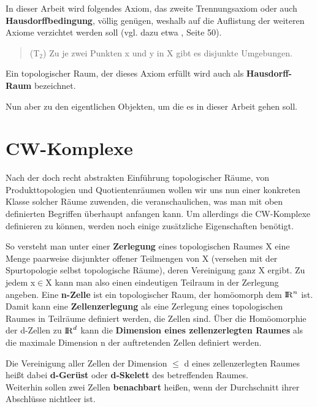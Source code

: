 In dieser Arbeit wird folgendes Axiom, das zweite Trennungsaxiom oder
auch {\bf Hausdorffbedingung}, völlig genügen, weshalb auf die Auflistung
der weiteren Axiome verzichtet werden soll (vgl. dazu etwa \cite{Os:92},
Seite 50).
\begin{quote}
(T$_2$) Zu je zwei Punkten x und y in X gibt es disjunkte Umgebungen.
\end{quote}
Ein topologischer Raum, der dieses Axiom erfüllt wird auch als
{\bf Hausdorff-Raum} bezeichnet.

Nun aber zu den eigentlichen Objekten, um die es in dieser Arbeit gehen soll.

\section{CW-Komplexe}

Nach der doch recht abstrakten Einführung topologischer Räume, von
Produkttopologien und Quotientenräumen wollen wir uns nun einer konkreten
Klasse solcher Räume zuwenden, die veranschaulichen, was man mit oben
definierten Begriffen überhaupt anfangen kann. Um allerdings die CW-Komplexe
definieren zu können, werden noch einige zusätzliche Eigenschaften benötigt.

So versteht man unter einer {\bf Zerlegung} eines topologischen
Raumes X eine Menge paarweise disjunkter offener Teilmengen von X (versehen mit
der Spurtopologie selbst topologische Räume), deren Vereinigung ganz X ergibt.
Zu jedem x$\in$X kann man also einen eindeutigen Teilraum in der Zerlegung
angeben. Eine {\bf n-Zelle} ist ein topologischer Raum,
der homöomorph dem $\mbox{$\rm I\!R$}^n$ ist. Damit kann eine {\bf Zellenzerlegung}
 als eine Zerlegung eines topologischen Raumes in
Teilräume definiert werden, die Zellen sind. Über die Homöomorphie der
d-Zellen zu $\mbox{$\rm I\!R$}^d$ kann die {\bf Dimension eines zellenzerlegten Raumes} als die
maximale Dimension n der auftretenden Zellen definiert werden.

Die Vereinigung aller Zellen der Dimension $\leq$ d eines zellenzerlegten
Raumes heißt dabei {\bf d-Gerüst} oder {\bf d-Skelett} des betreffenden Raumes.
\\
Weiterhin sollen zwei Zellen {\bf benachbart} heißen, wenn der
Durchschnitt ihrer Abschlüsse nichtleer ist.


